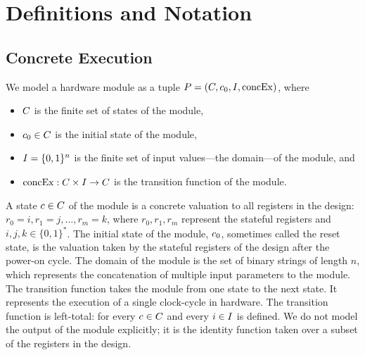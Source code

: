 \section{Definitions and Notation}
\subsection{Concrete Execution}



We model a hardware module as a tuple $P = (C,
c_0, I,\mathrm{concEx})$, where
\begin{itemize}
\item $C$ is the finite set of states of the module,
\item $c_0 \in C$ is the initial state of the module,
\item $I = \{0,1\}^n$ is the finite set of input values---the domain---of the module, and
\item $\mathrm{concEx}: C \times I \rightarrow C$ is the transition function of the module.
\end{itemize}


A state $c \in C$ of the module is a concrete valuation to all
registers in the design: $r_0 = i, r_1 = j, \ldots, r_m = k$, where $r_0, r_1,
r_m$ represent the stateful registers and $i, j, k
\in \{0,1\}^*$. 
The initial state of the module, $c_0$, sometimes called the reset state, is the
valuation taken by the stateful registers of the design after the power-on
cycle.
The domain of the module is the set of binary strings of length $n$, which
represents the concatenation of multiple input parameters to the module.
The transition function takes the module from one state to the next state. It
represents the execution of a single clock-cycle in hardware. The transition function is
left-total: for every $c \in C$ and every $i \in
I$ \concexecution{} is defined. We do not model the output of the
module explicitly; it is the identity function taken over a subset of the
registers in the design.


